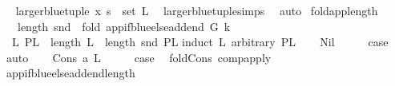 \begin{isabellebody}
\ \isamarkupfalse%
\ {\isachardoublequoteopen}larger{\isacharunderscore}{\kern0pt}blue{\isacharunderscore}{\kern0pt}tuple\ x\ s\ {\isasymin}\ set\ L{\isachardoublequoteclose}\ \isamarkupfalse%
\ larger{\isacharunderscore}{\kern0pt}blue{\isacharunderscore}{\kern0pt}tuple{\isachardot}{\kern0pt}simps\ \isamarkupfalse%
\ auto\isanewline
{}\isamarkupfalse%
%
\endisatagproof
{\isafoldproof}%
%
\isadelimproof
%
\endisadelimproof
%
\isadelimdocument
%
\endisadelimdocument
%
\isatagdocument
%
\isamarkuptrue%
%
\endisatagdocument
{\isafolddocument}%
%
\isadelimdocument
%
\endisadelimdocument
{}\isamarkupfalse%
\ fold{\isacharunderscore}{\kern0pt}app{\isacharunderscore}{\kern0pt}length{\isacharcolon}{\kern0pt}\isanewline
\ \ \ {\isachardoublequoteopen}length\ {\isacharparenleft}{\kern0pt}snd\ \ {\isacharparenleft}{\kern0pt}fold\ {\isacharparenleft}{\kern0pt}app{\isacharunderscore}{\kern0pt}if{\isacharunderscore}{\kern0pt}blue{\isacharunderscore}{\kern0pt}else{\isacharunderscore}{\kern0pt}add{\isacharunderscore}{\kern0pt}end\ G\ k{\isacharparenright}{\kern0pt}\ \isanewline
\ \ L{}\ PL{}{\isacharparenright}{\kern0pt}{\isacharparenright}{\kern0pt}\ {\isacharequal}{\kern0pt}\ length\ L{}\ {\isacharplus}{\kern0pt}\ length\ {\isacharparenleft}{\kern0pt}snd\ PL{}{\isacharparenright}{\kern0pt}{\isachardoublequoteclose}\isanewline
%
\isadelimproof
%
\endisadelimproof
%
\isatagproof
{}\isamarkupfalse%
{\isacharparenleft}{\kern0pt}induct\ L{}\ arbitrary{\isacharcolon}{\kern0pt}\ PL{}{\isacharparenright}{\kern0pt}\isanewline
\ \ \isamarkupfalse%
\ Nil\isanewline
\ \ \isamarkupfalse%
\ \isamarkupfalse%
\ {\isacharquery}{\kern0pt}case\ \isamarkupfalse%
\ auto\isanewline
{}\isamarkupfalse%
\isanewline
\ \ \isamarkupfalse%
\ {\isacharparenleft}{\kern0pt}Cons\ a\ L{}{\isacharparenright}{\kern0pt}\isanewline
\ \ \isamarkupfalse%
\ \isamarkupfalse%
\ {\isacharquery}{\kern0pt}case\ \isamarkupfalse%
\ fold{\isacharunderscore}{\kern0pt}Cons\ comp{\isacharunderscore}{\kern0pt}apply\ \isamarkupfalse%
\ app{\isacharunderscore}{\kern0pt}if{\isacharunderscore}{\kern0pt}blue{\isacharunderscore}{\kern0pt}else{\isacharunderscore}{\kern0pt}add{\isacharunderscore}{\kern0pt}end{\isacharunderscore}{\kern0pt}length\isanewline

\end{isabellebody}
